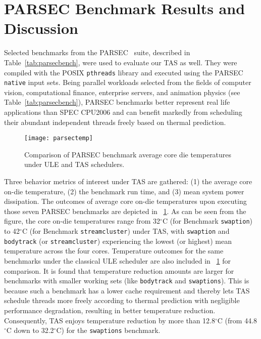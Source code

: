 \section{PARSEC Benchmark Results and Discussion}
\label{sec:mult-behav} 
Selected benchmarks from the PARSEC~\cite{Bienia2008} suite, described
in Table~\ref{tab:parsecbench}, were used to evaluate our TAS as well.
They were compiled with the POSIX \texttt{pthreads} library and executed
using the PARSEC \texttt{native} input sets.  Being parallel workloads
selected from the fields of computer vision, computational finance,
enterprise servers, and animation physics (see Table~\ref{tab:parsecbench}), PARSEC
benchmarks better represent real life applications than SPEC CPU2006 and
can benefit markedly from scheduling their abundant independent threads
freely based on thermal prediction.

\begin{figure}[tbp] 
\centering
  \texttt{[image: parsectemp]}
  \caption{Comparison of PARSEC benchmark average core die temperatures
under ULE and TAS schedulers.}
  \label{fig:pbenchmarkt}
\end{figure}
Three behavior metrics of interest under TAS are gathered: (1) the
average core on-die temperature, (2) the benchmark run time, and (3)
mean system power dissipation.  The outcomes of average core on-die
temperatures upon executing those seven PARSEC benchmarks are depicted
in \figurename~\ref{fig:pbenchmarkt}.  As can be seen from the figure,
the core on-die temperatures range from 32$^\circ$C (for Benchmark
\texttt{swaption}) to 42$^\circ$C (for Benchmark \texttt{streamcluster})
under TAS, with \texttt{swaption} and \texttt{bodytrack} (or
\texttt{streamcluster}) experiencing the lowest (or highest) mean
temperature across the four cores.  Temperature outcomes for the same
benchmarks under the classical ULE scheduler are also included in
\figurename~\ref{fig:pbenchmarkt} for comparison.  It is found that
temperature reduction amounts are larger for benchmarks with smaller
working sets (like \texttt{bodytrack} and \texttt{swaptions}).  This is
because such a benchmark has a lower cache requirement \cite{Bienia2011}
and thereby lets TAS schedule threads more freely according to thermal
prediction with negligible performance degradation, resulting in better
temperature reduction.  Consequently, TAS enjoys temperature reduction
by more than 12.8$^{\circ}$C (from 44.8$^{\circ}$C down to
32.2$^{\circ}$C) for the \texttt{swaptions} benchmark.
  
